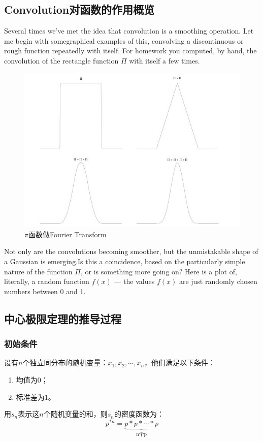 \subsection{Convolution对函数的作用概览}
Several times we've met the idea that convolution is a smoothing
operation. Let me begin with somegraphical examples of this,
convolving a discontinuous or rough function repeatedly with itself.
For homework you computed, by hand, the convolution of the rectangle
function $\Pi$ with itself a few times.
\begin{figure}[H]
	\centering
	\includegraphics[scale=0.4]{assets/PI.jpg}
	\caption{$\pi$函数做Fourier Transform}
\end{figure}
Not only are the convolutions becoming smoother, but the
unmistakable shape of a Gaussian is emerging.Is this a coincidence,
based on the particularly simple nature of the function $\Pi$, or
is something more going on? Here is a plot of, literally, a random
function $f(x)$ --- the values $f(x)$ are just randomly chosen
numbers between 0 and 1.

\subsection{中心极限定理的推导过程}
\subsubsection{初始条件}
设有$n$个独立同分布的随机变量：$x_1,x_2,\cdots,x_n$，他们满足以下条件：
\begin{enumerate}
	\def\labelenumi{\arabic{enumi}.}
	\item
	      均值为$0$；
	\item
	      标准差为$1$。
\end{enumerate}
用$s_n$表示这$n$个随机变量的和，则$s_n$的密度函数为：
$$
	p^{*n}=\underbrace{p*p*\cdots *p}_{\text{n个p}}
$$

